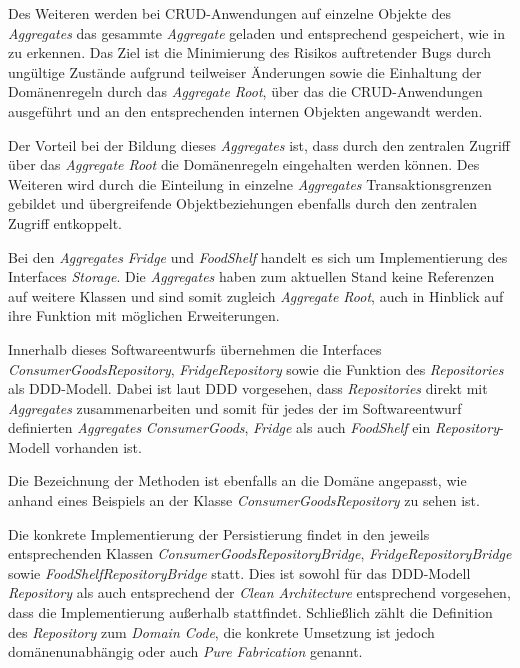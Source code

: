 Des Weiteren werden bei \ac{CRUD}-Anwendungen auf einzelne Objekte des \textit{Aggregates} das gesammte \textit{Aggregate} geladen und entsprechend gespeichert, wie in  zu erkennen.
Das Ziel ist die Minimierung des Risikos auftretender Bugs durch ungültige Zustände aufgrund teilweiser Änderungen sowie die Einhaltung der Domänenregeln durch das \textit{Aggregate Root}, über das die \ac{CRUD}-Anwendungen ausgeführt und an den entsprechenden internen Objekten angewandt werden.

Der Vorteil bei der Bildung dieses \textit{Aggregates} ist, dass durch den zentralen Zugriff über das \textit{Aggregate Root} die Domänenregeln eingehalten werden können.
Des Weiteren wird durch die Einteilung in einzelne \textit{Aggregates} Transaktionsgrenzen gebildet und übergreifende Objektbeziehungen ebenfalls durch den zentralen Zugriff entkoppelt.

Bei den \textit{Aggregates} \textit{Fridge} und \textit{FoodShelf} handelt es sich um Implementierung des Interfaces \textit{Storage}.
Die \textit{Aggregates} haben zum aktuellen Stand keine Referenzen auf weitere Klassen und sind somit zugleich \textit{Aggregate Root}, auch in Hinblick auf ihre Funktion mit möglichen Erweiterungen.

\label{domaindrivendesign>repositories}
Innerhalb dieses Softwareentwurfs übernehmen die Interfaces \textit{ConsumerGoodsRepository}, \textit{FridgeRepository} sowie  die Funktion des \textit{Repositories} als \ac{DDD}-Modell.
Dabei ist laut \ac{DDD} vorgesehen, dass \textit{Repositories} direkt mit \textit{Aggregates} zusammenarbeiten und somit für jedes der im Softwareentwurf definierten \textit{Aggregates} \textit{ConsumerGoods}, \textit{Fridge} als auch \textit{FoodShelf} ein \textit{Repository}-Modell vorhanden ist.

Die Bezeichnung der Methoden ist ebenfalls an die Domäne angepasst, wie anhand eines Beispiels an der Klasse \textit{ConsumerGoodsRepository} zu sehen ist.

Die konkrete Implementierung der Persistierung findet in den jeweils entsprechenden Klassen \textit{ConsumerGoodsRepositoryBridge}, \textit{FridgeRepositoryBridge} sowie \textit{FoodShelfRepositoryBridge} statt.
Dies ist sowohl für das \ac{DDD}-Modell \textit{Repository} als auch entsprechend der \textit{Clean Architecture} entsprechend vorgesehen, dass die Implementierung außerhalb stattfindet. 
Schließlich zählt die Definition des \textit{Repository} zum \textit{Domain Code}, die konkrete Umsetzung ist jedoch domänenunabhängig oder auch \textit{Pure Fabrication} genannt.
